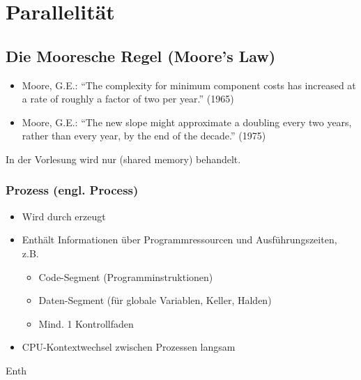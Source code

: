 \section{Parallelität}
\subsection{Die Mooresche Regel (Moore's Law)}
\begin{itemize}
    \item Moore, G.E.:
    “The complexity for minimum component costs has increased at a rate of roughly a factor of two per year.” (1965)
    \item Moore, G.E.:
    “The new slope might approximate a doubling every two years, rather than every year, by the end of the decade.” (1975)
\end{itemize}


In der Vorlesung wird nur  (shared memory) behandelt.

\subsubsection{Prozess (engl. Process)}
\begin{itemize}
    \item Wird durch  erzeugt
    \item Enthält Informationen über Programmressourcen und Ausführungszeiten, z.B. 
    \begin{itemize}
        \item Code-Segment (Programminstruktionen)
        \item Daten-Segment (für globale Variablen, Keller, Halden)
        \item Mind. 1 Kontrollfaden
    \end{itemize}
    \item CPU-Kontextwechsel zwischen Prozessen langsam
\end{itemize}Enth

